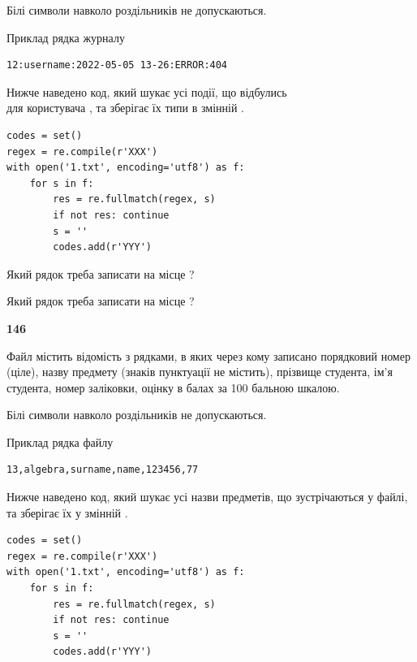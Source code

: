 Білі символи навколо роздільників не допускаються.

Приклад рядка журналу



\begin{verbatim}
12:username:2022-05-05 13-26:ERROR:404
\end{verbatim}


Нижче наведено код, який шукає усі події, що відбулись\\ для користувача , та зберігає їх типи в змінній .



\begin{verbatim}
codes = set()
regex = re.compile(r'XXX')
with open('1.txt', encoding='utf8') as f:
    for s in f:
        res = re.fullmatch(regex, s)
        if not res: continue
        s = ''
        codes.add(r'YYY')
\end{verbatim}





Який рядок треба записати на місце  ?\par
\vspace{5mm}


Який рядок треба записати на місце  ?\par


\newpage

{\begin {center}\textbf{ 146}\end {center}}\par
Файл  містить відомість з рядками, в яких через кому записано поряд\-ковий номер (ціле), назву предмету (знаків пунктуації не містить), прізвище студента, ім'я студента, номер заліковки, оцінку в балах за 100 бальною шкалою.

Білі символи навколо роздільників не допускаються.

Приклад рядка файлу



\begin{verbatim}
13,algebra,surname,name,123456,77
\end{verbatim}


Нижче наведено код, який шукає усі назви предметів, що зустрічаються у файлі, та зберігає їх у змінній .



\begin{verbatim}
codes = set()
regex = re.compile(r'XXX')
with open('1.txt', encoding='utf8') as f:
    for s in f:
        res = re.fullmatch(regex, s)
        if not res: continue
        s = ''
        codes.add(r'YYY')
\end{verbatim}





